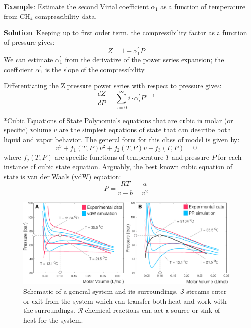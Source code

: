 \documentclass[11pt]{article}
\makeatletter
\theoremstyle{definition}
\renewcommand\subsubsection{\@startsection
	{subsubsection}{2}{0mm}
	{-0.05in}
	{-0.5\baselineskip}
	{\normalfont\normalsize\bfseries}}
\makeatother
\begin{document}
\begin{mdframed}[backgroundcolor=lgray]
  \noindent\textbf{Example}: Estimate the second Virial coefficient $\alpha_{1}$ as a function of temperature from CH$_{\mathrm{4}}$ compressibility data.

	\vspace{0.2in}

	\noindent\textbf{Solution}:
	Keeping up to first order term, the compressibility factor as a function of pressure gives:
	\begin{equation}
		Z = 1 + \alpha^{\prime}_{1}P
	\end{equation}We can estimate $\alpha^{\prime}_{1}$ from the derivative of the power series expansion;
	the coefficient $\alpha^{\prime}_{1}$ is the slope of the compressibility  

	Differentiating the Z pressure power series with respect to pressure gives:
	\begin{equation}
		\frac{dZ}{dP} = \sum_{i=0}^{\infty}i\cdot\alpha^{\prime}_{i}P^{i-1}
	\end{equation}



\end{mdframed}

\clearpage

\subsubsection*{Cubic Equations of State}
Polynomials equations that are cubic in molar (or specific) volume $v$ are the simplest equations of state that can describe both liquid and vapor behavior.
The general form for this class of model is given by:
\begin{equation}
v^{3}+f_{1}(T,P)v^2+f_{2}(T,P)v+f_{3}(T,P) = 0
\end{equation}
where $f_{j}(T,P)$ are specific functions of temperature $T$ and pressure $P$ for each instance of cubic state equation.
Arguably, the best known cubic equation of state is van der Waals (vdW) equation:
\begin{equation}
  \displaystyle P = \frac{RT}{v-b} - \frac{a}{v^2}
\end{equation}

\begin{figure}\center
  \includegraphics[width=1.0\textwidth]{./figs/Fig-CubicEOS.pdf}
  \caption{Schematic of a general system and its surroundings.
  $\mathcal{S}$ streams enter or exit from the system which can transfer both heat and work with the surroundings.
  $\mathcal{R}$ chemical reactions can act a source or sink of heat for the system.}\label{fig-energy-schematic}
\end{figure}
\end{document}

